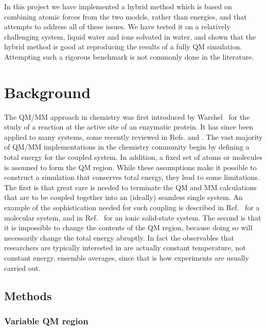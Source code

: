 \documentclass[11pt]{revtex4}
\begin{document}
In this project we have implemented a hybrid method which is based on combining atomic
forces from the two models, rather than energies, and that attempts to address all of these issues.  We have tested
it on a relatively challenging system, liquid water and ions solvated
in water, and shown that the hybrid method is good at reproducing
the results of a fully QM simulation. Attempting such a rigorous benchmark is not commonly
done in the literature.

\section{Background}

The QM/MM approach in chemistry was first introduced by
Warshel~\cite{warshel_j_mol_biol_1976a} for the study of a reaction
at the active site of an enzymatic protein.  It has since been
applied to many systems, some recently reviewed in
Refs.  and
.  The vast majority of QM/MM
implementations in the chemistry community begin by defining a total
energy for the coupled system.  In addition, a fixed set of atoms
or molecules is assumed to form the QM region.  While these assumptions
make it possible to construct a simulation that conserves total
energy, they lead to some limitations.  The first is that great
care is needed to terminate the QM and MM calculations that are to
be coupled together into an (ideally) seamless single system.  An
example of the sophistication needed for such coupling is described
in Ref.~ for a molecular system, and in
Ref.~ for an ionic solid-state
system.  The second is that it is impossible to change the contents
of the QM region, because doing so will necessarily change the total
energy abruptly.  In fact the observables that researchers are typically
interested in are actually constant temperature, not constant energy,
ensemble averages, since that is how experiments are usually carried
out.

\subsection{Methods}

\subsubsection{Variable QM region}
\end{document}
